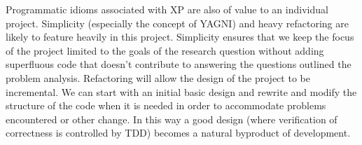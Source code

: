 Programmatic idioms associated with XP are also of value to an individual project. Simplicity (especially the concept of YAGNI) and heavy refactoring are likely to feature heavily in this project. Simplicity ensures that we keep the focus of the project limited to the goals of the research question without adding superfluous code that doesn't contribute to answering the questions outlined the problem analysis. Refactoring will allow the design of the project to be incremental. We can start with an initial basic design and rewrite and modify the structure of the code when it is needed in order to accommodate problems encountered or other change. In this way a good design (where verification of correctness is controlled by TDD) becomes a natural byproduct of development.


